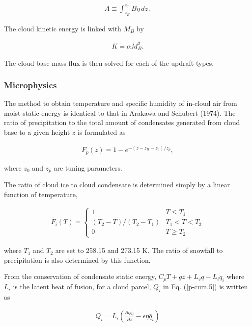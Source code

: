 \begin{eqnarray}
 A \equiv \int_{z_B}^{z_T} B \eta \,dz\,.
\end{eqnarray}

The cloud kinetic energy is linked with \(M_B\) by

\begin{eqnarray}
 K = \alpha M_B^2.  \label{p-cum.9}
\end{eqnarray}

The cloud-base mass flux is then solved for each of the updraft types.

\hypertarget{microphysics}{%
\subsubsection{Microphysics}\label{microphysics}}

The method to obtain temperature and specific humidity of in-cloud air
from moist static energy is identical to that in Arakawa and Schubert
(1974). The ratio of precipitation to the total amount of condensates
generated from cloud base to a given height \(z\) is formulated as

\begin{eqnarray}
 F_p(z) = 1 - e^{-(z - z_B - z_0)/z_p},
\end{eqnarray}

where \(z_0\) and \(z_p\) are tuning parameters.

The ratio of cloud ice to cloud condensate is determined simply by a
linear function of temperature,

\begin{eqnarray}
 F_i(T) = \begin{cases} 1 & T \leq T_1 \\ (T_2 - T)/(T_2 - T_1) & T_1 < T < T_2 \\ 0  & T \geq T_2 \end{cases}
\end{eqnarray}

where \(T_1\) and \(T_2\) are set to 258.15 and 273.15 K. The ratio of
snowfall to precipitation is also determined by this function.

From the conservation of condensate static energy,
\(C_p T + gz + L_v q - L_i q_i\) where \(L_i\) is the latent heat of
fusion, for a cloud parcel, \(Q_i\) in Eq. (\ref{p-cum.5}) is
written as

\begin{eqnarray}
 Q_i = L_i \left(\frac{\partial \eta \hat{q}_i}{\partial z} - \epsilon\eta\bar{q}_i\right)
\end{eqnarray}

